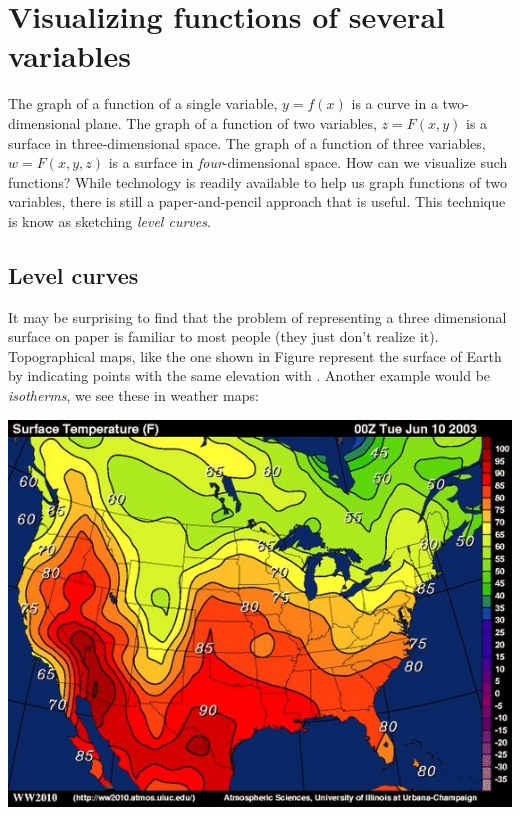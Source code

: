 \documentclass{ximera}
\begin{document}
\section{Visualizing functions of several variables}


The graph of a function of a single variable, $y=f(x)$ is a curve in a
two-dimensional plane. The graph of a function of two variables, $z =
F(x,y)$ is a surface in three-dimensional space. The graph of a
function of three variables, $w=F(x,y,z)$ is a surface in
\textit{four}-dimensional space. How can we visualize such functions?
While technology is readily available to help us graph functions of two
variables, there is still a paper-and-pencil approach that is useful.
This technique is know as sketching \textit{level curves}.


\subsection{Level curves}


It may be surprising to find that the problem of representing a three
dimensional surface on paper is familiar to most people (they just
don't realize it).  Topographical maps, like the one shown in Figure
represent the surface of Earth by indicating points with the same
elevation with . Another example would be
\textit{isotherms}, we see these in weather maps:

\begin{image}
  \includegraphics{isotherm.jpg}
\end{image}
\end{document}

